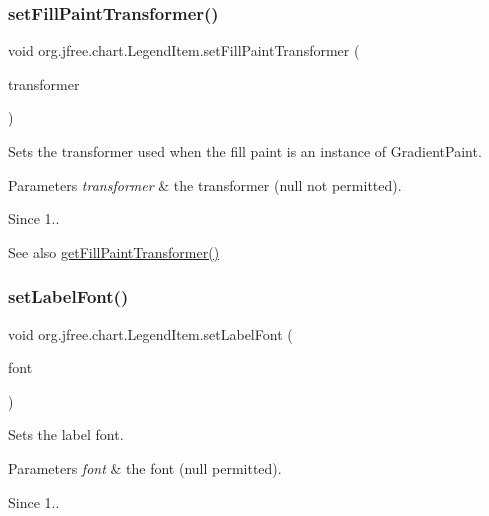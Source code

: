 \subsubsection{\texorpdfstring{set\+Fill\+Paint\+Transformer()}{setFillPaintTransformer()}}
{\footnotesize\ttfamily void org.\+jfree.\+chart.\+Legend\+Item.\+set\+Fill\+Paint\+Transformer (\begin{DoxyParamCaption}\item[{Gradient\+Paint\+Transformer}]{transformer }\end{DoxyParamCaption})}

Sets the transformer used when the fill paint is an instance of {\ttfamily Gradient\+Paint}.


\begin{DoxyParams}{Parameters}
{\em transformer} & the transformer ({\ttfamily null} not permitted).\\
\hline
\end{DoxyParams}
\begin{DoxySince}{Since}
1..
\end{DoxySince}
\begin{DoxySeeAlso}{See also}
\mbox{\hyperlink{classorg_1_1jfree_1_1chart_1_1_legend_item_a813bf6cb2c706b32c286722575d92d40}{get\+Fill\+Paint\+Transformer()}} 
\end{DoxySeeAlso}
\mbox{\label{classorg_1_1jfree_1_1chart_1_1_legend_item_a20a86ff5e492a4bb6cf9baba5146e090}} 
\subsubsection{\texorpdfstring{set\+Label\+Font()}{setLabelFont()}}
{\footnotesize\ttfamily void org.\+jfree.\+chart.\+Legend\+Item.\+set\+Label\+Font (\begin{DoxyParamCaption}\item[{Font}]{font }\end{DoxyParamCaption})}

Sets the label font.


\begin{DoxyParams}{Parameters}
{\em font} & the font ({\ttfamily null} permitted).\\
\hline
\end{DoxyParams}
\begin{DoxySince}{Since}
1.. 
\end{DoxySince}
\mbox{\label{classorg_1_1jfree_1_1chart_1_1_legend_item_acaa512c2d69e6b65ea5313b54b5e7236}} 
